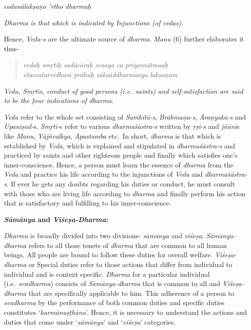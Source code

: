 \emph{codanālakṣaṇo 'rtho dharmaḥ }

\emph{Dharma is that which is indicated by Injunctions (of vedas).}

Hence, \emph{Veda-s} are the ultimate source of \emph{dharma}. \emph{Manu} (6) further elaborates it thus-

\begin{verse}
\emph{vedaḥ smṛtiḥ sadācāraḥ svasya ca priyamātmaaḥ }\\
\emph{etaccaturvidhaṁ prāhuḥ sākṣāddharmasya lakṣaṇam }
\end{verse}

\emph{Veda, Smṛtis, conduct of good persons (i.e.\ saints) and self-satisfaction are said to be the four indications of dharma.}

\emph{Veda} refer to the whole set consisting of \emph{Saṁhitā-s}, \emph{Brāhmaṇa-s}, \emph{Āraṇyaka-s} and \emph{Upaniṣad-}s. \emph{Smṛti-}s refer to various \emph{dharmaśāstra-s} written by \emph{ṛṣi-s} and \emph{jñānī}s like \emph{Manu}, \emph{Yājñvalkya}, \emph{Āpastamba} etc.\ In short, \emph{dharma} is that which is established by \emph{Veda}, which is explained and stipulated in \emph{dharmaśāstra-s} and practiced by saints and other righteous people and finally which satisfies one's inner-conscience. Hence, a person must learn the essence of \emph{dharma} from the \emph{Veda} and practice his life according to the injunctions of \emph{Veda} and \emph{dharmaśāstra-s}. If ever he gets any doubts regarding his duties or conduct, he must consult with those who are living life according to \emph{dharma} and finally perform his action that is satisfactory and fulfilling to his inner-conscience.

\textbf{\emph{Sāmānya} and \emph{Viśeṣa-Dharma}:}
\newpage

\emph{Dharma} is broadly divided into two divisions- \emph{sāmānya} and \emph{viśeṣa}. \emph{Sāmānya-dharma} refers to all those tenets of \emph{dharma} that are common to all human beings. All people are bound to follow these duties for overall welfare. \emph{Viśeṣa-dharma} or Special duties refer to those actions that differ from individual to individual and is context specific. \emph{Dharma} for a particular individual (i.e.\ \emph{svadharma}) consists of \emph{Sāmānya-dharma} that is common to all and \emph{Viśeṣa-dharma} that are specifically applicable to him. This adherence of a person to \emph{svadharma} by the performance of both common duties and specific duties constitutes `\emph{karmānuṣṭhāna}'. Hence, it is necessary to understand the actions and duties that come under `\emph{sāmānya}' and `\emph{viśeṣa}' categories.

